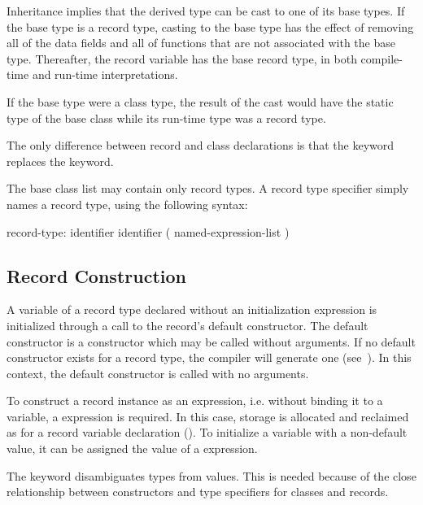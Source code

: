 \begin{rationale}
Inheritance implies that the derived type can be cast to one of its base types.
If the base type is a record type, casting to the base type has the effect of
removing all of the data fields and all of functions that are not associated
with the base type.  Thereafter, the record variable has the base record type,
in both compile-time and run-time interpretations.

If the base type were a class type, the result of the cast would have the static
type of the base class while its run-time type was a record type.
\end{rationale}
The only difference between record and class declarations is that
the  keyword replaces the  keyword.

The base class list may contain only record types.
A record type specifier simply names a record type, using
the following syntax:
\begin{syntax}
record-type:
  identifier
  identifier ( named-expression-list )
\end{syntax}

\subsection{Record Construction}
\label{Record_Construction}

A variable of a record type declared without an initialization expression
is initialized through a call to the record's default constructor.
The default constructor is a constructor which may be
called without arguments.  If no default constructor exists for a record type,
the compiler will generate one (see~).  In this
context, the default constructor is called with no arguments.  

To construct a record instance as an expression,
i.e. without binding it to a variable, a  expression is
required.  In this case, storage is allocated and reclaimed as for a record
variable declaration ().
To initialize a variable with a non-default value, it can be assigned
the value of a  expression.

\begin{rationale}
The  keyword disambiguates types from values. This is needed because of the close
relationship between constructors and type specifiers for classes and
records.
\end{rationale}


